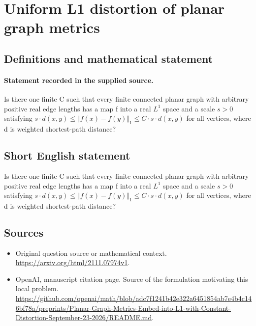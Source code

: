 \documentclass[11pt]{article}
\begin{document}
\section*{Uniform L1 distortion of planar graph metrics}\label{30007124}
\subsection{Definitions and mathematical statement}
\paragraph{Statement recorded in the supplied source.}
Is there one finite C such that every finite connected planar graph with arbitrary positive real edge lengths has a map f into a real $L^{1}$ space and a scale $s>0$ satisfying $s\cdot d(x,y)\leq \Vert f(x)-f(y)\Vert _{1}\leq C\cdot s\cdot d(x,y)$ for all vertices, where d is weighted shortest-path distance?
\subsection{Short English statement}
Is there one finite C such that every finite connected planar graph with arbitrary positive real edge lengths has a map f into a real $L^{1}$ space and a scale $s>0$ satisfying $s\cdot d(x,y)\leq \Vert f(x)-f(y)\Vert _{1}\leq C\cdot s\cdot d(x,y)$ for all vertices, where d is weighted shortest-path distance?
\subsection{Sources}
\begin{itemize}
\item[S1] Original question source or mathematical context.
\url{https://arxiv.org/html/2111.07974v1}.
\item[S2] OpenAI, manuscript citation page. Source of the formulation motivating this local problem.
\url{https://github.com/openai/math/blob/adc7f1241b42e322a6451854ab7e4b4c146bf78a/preprints/Planar-Graph-Metrics-Embed-into-L1-with-Constant-Distortion-September-23-2026/README.md}.
\end{itemize}
\end{document}
